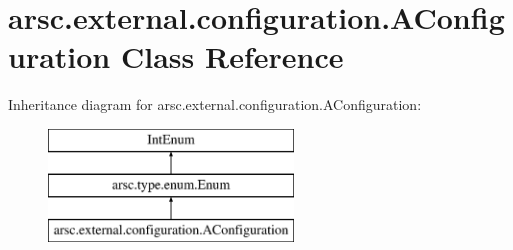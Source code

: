 \hypertarget{classarsc_1_1external_1_1configuration_1_1AConfiguration}{}\section{arsc.\+external.\+configuration.\+A\+Configuration Class Reference}
\label{classarsc_1_1external_1_1configuration_1_1AConfiguration}
Inheritance diagram for arsc.\+external.\+configuration.\+A\+Configuration\+:\begin{figure}[H]
\begin{center}
\leavevmode
\includegraphics[height=3.000000cm]{classarsc_1_1external_1_1configuration_1_1AConfiguration}
\end{center}
\end{figure}
